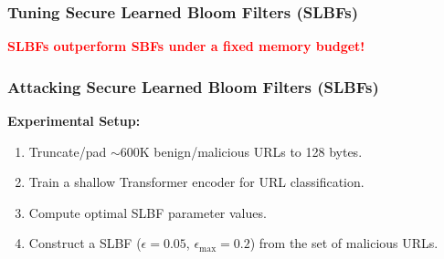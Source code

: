 \documentclass{beamer}
\begin{document}

\begin{frame}
\frametitle{Tuning Secure Learned Bloom Filters (SLBFs)}

\begin{center}

    \textcolor{red}{\textbf{SLBFs outperform SBFs under a fixed memory budget!}}
\end{center}

\end{frame}



\begin{frame}
\frametitle{Attacking Secure Learned Bloom Filters (SLBFs)}

\textbf{Experimental Setup:}
\begin{enumerate}
    \item Truncate/pad $\sim600$K benign/malicious URLs to 128 bytes.
    \item Train a shallow Transformer encoder for URL classification.
    \item Compute optimal SLBF parameter values.
    \item Construct a SLBF ($\epsilon=0.05$, $\epsilon_\text{max} = 0.2$) from the set of malicious URLs.
\end{enumerate}

\end{frame}

\end{document}
